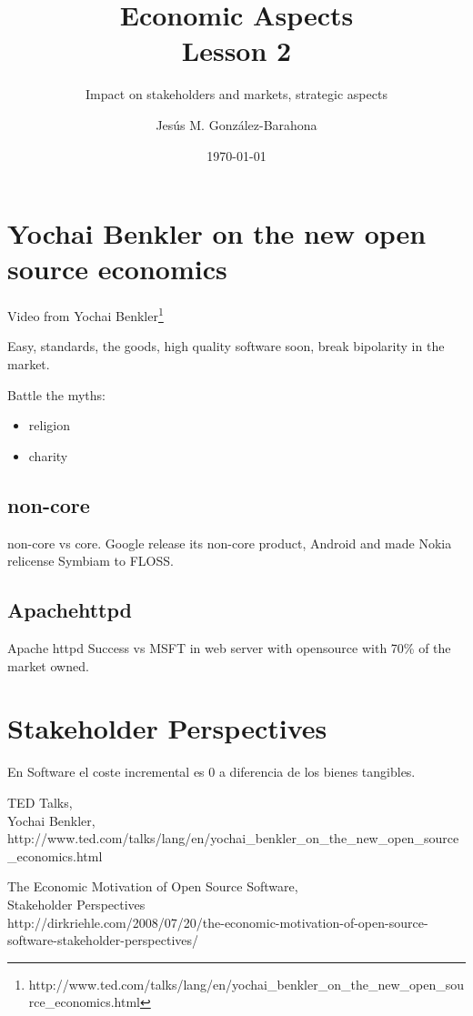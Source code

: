 \documentclass[11pt]{scrartcl}
\title{\textbf{Economic Aspects\\
                Lesson 2}}
\subtitle{Impact on stakeholders and markets, strategic aspects}
\author{Jesús M. González-Barahona}
\date{\today}
\begin{document}
\maketitle

\section{Yochai Benkler on the new open source economics}

Video from Yochai Benkler\footnote{http://www.ted.com/talks/lang/en/yochai\_benkler\_on\_the\_new\_open\_source\_economics.html}

Easy, standards, the goods, high quality software soon, break bipolarity in the market.

Battle the myths:
\begin{itemize}
    \item religion
    \item charity
\end{itemize}

\subsection{non-core}

non-core vs core. Google release its non-core product, Android and made Nokia relicense Symbiam to FLOSS.

\subsection{Apachehttpd}

Apache httpd Success vs MSFT in web server with opensource with 70\% of the market owned.

\section{Stakeholder Perspectives}

En Software el coste incremental es 0 a diferencia de los bienes tangibles.

\begin{thebibliography}{9}

    TED Talks,\\
    Yochai Benkler,\\
    http://www.ted.com/talks/lang/en/yochai\_benkler\_on\_the\_new\_open\_source\_economics.html
    
    The Economic Motivation of Open Source Software,\\
    Stakeholder Perspectives\\
    http://dirkriehle.com/2008/07/20/the-economic-motivation-of-open-source-software-stakeholder-perspectives/
\end{thebibliography}
\end{document}

